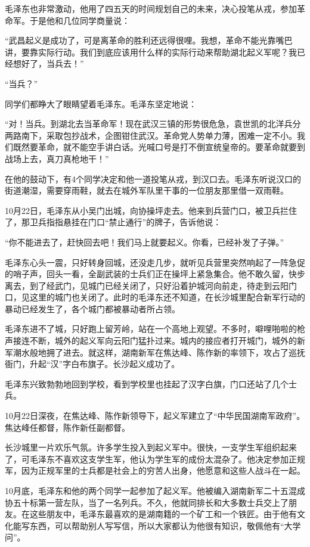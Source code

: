 \documentclass[../../dazhuan.tex]{subfiles}
\begin{document}
毛泽东也非常激动，他用了四五天的时间规划自己的未来，决心投笔从戎，参加革命军。于是他和几位同学商量说：

“武昌起义是成功了，可是离革命的胜利还远得很哩。我想，革命不能光靠嘴巴讲，要靠实际行动。我们到底应该用什么样的实际行动来帮助湖北起义军呢？我已经想好了，当兵去！”

“当兵？”

同学们都睁大了眼睛望着毛泽东。毛泽东坚定地说：

“对！当兵。到湖北去当革命军！现在武汉三镇的形势很危急，袁世凯的北洋兵分两路南下，采取包抄战术，企图钳住武汉。革命党人势单力薄，困难一定不小。我们既然要革命，就不能空手讲白话。光喊口号是打不倒宣统皇帝的。要革命就要到战场上去，真刀真枪地干！”

在他的鼓动下，有4个同学决定和他一道投笔从戎，到汉口去。毛泽东听说汉口的街道潮湿，需要穿雨鞋，就去在城外军队里干事的一位朋友那里借一双雨鞋。

10月22日，毛泽东从小吴门出城，向协操坪走去。他来到兵营门口，被卫兵拦住了，那卫兵指指悬挂在门口“禁止通行”的牌子，告诉他说：

“你不能进去了，赶快回去吧！我们马上就要起义。你看，已经补发了子弹。”

毛泽东心头一震，只好转身回城，还没走几步，就听见兵营里突然响起了一阵急促的哨子声，回头一看，全副武装的士兵们正在操坪上紧急集合。他不敢久留，快步离去，到了经武门，见城门已经关闭了，只好沿着护城河向前走，待走到云阳门口，见这里的城门也关闭了。此时的毛泽东还不知道，在长沙城里配合新军行动的暴动已经发生了，各个城门都被暴动者所占领。

毛泽东进不了城，只好跑上留芳岭，站在一个高地上观望。不多时，噼哩啪啦的枪声接连不断，城外的起义军向云阳门猛扑过来。城内的接应者打开城门，城外的新军潮水般地拥了进去。就这样，湖南新军在焦达峰、陈作新的率领下，攻占了巡抚衙门，升起“汉”字白布旗子。长沙起义成功了。

毛泽东兴致勃勃地回到学校，看到学校里也挂起了汉字白旗，门口还站了几个士兵。

10月22日深夜，在焦达峰、陈作新领导下，起义军建立了“中华民国湖南军政府”。焦达峰任都督，陈作新任副都督。

长沙城里一片欢乐气氛。许多学生投入到起义军中。很快，一支学生军组织起来了，可毛泽东不喜欢这支学生军，他认为学生军的成份太混杂了。他决定参加正规军，因为正规军里的士兵都是社会上的穷苦人出身，他愿意和这些人战斗在一起。

10月底，毛泽东和他的两个同学一起参加了起义军。他被编入湖南新军二十五混成协五十标第一营左队，当了一名列兵。不久，他就同排长和大多数士兵交上了朋友。在这些朋友中，毛泽东最喜欢的是湖南籍的一个矿工和一个铁匠。由于他有文化能写东西，可以帮助别人写写信，所以大家都认为他很有知识，敬佩他有“大学问”。
\end{document}
